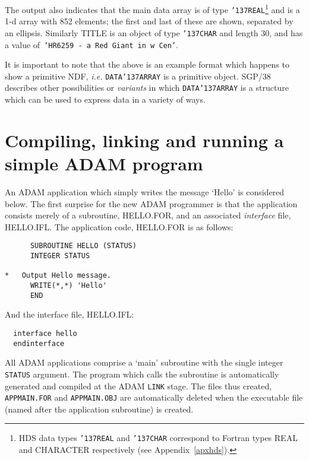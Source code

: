 \documentclass[twoside,11pt]{article}
\renewcommand{\_}{{\tt\char'137}}
\newcommand{\xref}[3]{#1}
\newcommand{\xlabel}[1]{}
\begin{document}
The output also indicates that the main data array is of type 
{\tt\_REAL}\footnote{HDS data types {\tt\_REAL} and {\tt\_CHAR} correspond to Fortran types REAL
and CHARACTER respectively (see Appendix~\ref{apxhds}).}
and is a 1-d array with 852 elements;
the first and last of these are shown, separated by an ellipsis.
Similarly  TITLE is an object of type {\tt\_CHAR} and length 
30, and has a value of\ {\tt 'HR6259 - a Red Giant in w Cen'}.

It is important to note that the above  is an example format which
happens to show a primitive NDF, 
{\it i.e.} {\tt DATA\_ARRAY} is a primitive object.
\xref{SGP/38}{sgp38}{} describes other possibilities or {\sl variants\/} in
which {\tt DATA\_ARRAY} is a structure which  can be used to express
data in a variety of ways.


\newpage
\section{Compiling, linking and running a simple ADAM program\label{comp}\xlabel{compiling}}

An ADAM application which simply writes the message {`Hello'}
is considered below.
The first surprise for the new ADAM programmer is that the application 
consists merely of a subroutine, HELLO.FOR, and an
associated {\sl interface\/} file, HELLO.IFL.
The application code, HELLO.FOR is as follows:
\begin{verbatim}
      SUBROUTINE HELLO (STATUS)
      INTEGER STATUS

*   Output Hello message.
      WRITE(*,*) 'Hello'
      END                 
\end{verbatim}
And the  interface file, HELLO.IFL:
\begin{verbatim}
  interface hello
  endinterface
\end{verbatim}
All ADAM applications comprise a `main' subroutine with the single
integer {\tt STATUS} argument.
The program which calls the subroutine is automatically
generated and compiled at the ADAM {\tt LINK} stage.
The files thus created, {\tt APPMAIN.FOR} and {\tt APPMAIN.OBJ} 
are automatically deleted when the executable file (named after the 
application subroutine) is created.
\end{document}
